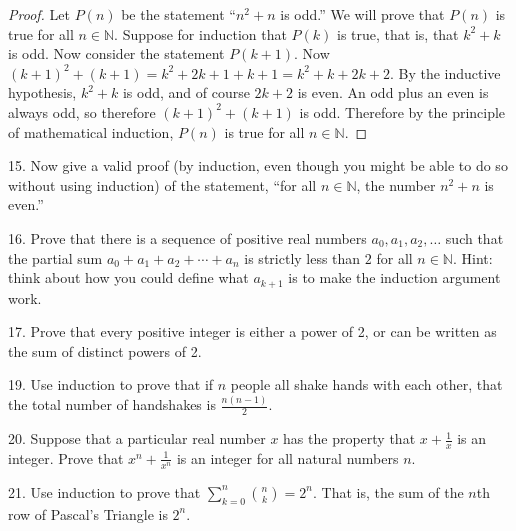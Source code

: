 \documentclass[10pt,]{book}
\theoremstyle{plain}
\theoremstyle{definition}
\numberwithin{equation}{chapter}
\def\d{\displaystyle}
\def\N{\mathbb N}
\begin{document}
\begin{exerciselist}
\begin{proof}
            Let \(P(n)\) be the statement ``\(n^2 + n\) is odd.'' We will prove that \(P(n)\) is true for all \(n \in \N\). Suppose for induction that \(P(k)\) is true, that is, that \(k^2 + k\) is odd. Now consider the statement \(P(k+1)\). Now \((k+1)^2 + (k+1) = k^2 + 2k + 1 + k + 1 = k^2 + k + 2k + 2\). By the inductive hypothesis, \(k^2 + k\) is odd, and of course \(2k + 2\) is even. An odd plus an even is always odd, so therefore \((k+1)^2 + (k+1)\) is odd. Therefore by the principle of mathematical induction, \(P(n)\) is true for all \(n \in \N\).
\end{proof}
\par\smallskip
\item[15.]\hypertarget{exercise-198}{}
          Now give a valid proof (by induction, even though you might be able to do so without using induction) of the statement, ``for all \(n \in \N\), the number \(n^2 + n\) is even.''
\par\smallskip
\item[16.]\hypertarget{exercise-199}{}
          Prove that there is a sequence of positive real numbers \(a_0, a_1, a_2, \ldots\) such that the partial sum \(a_0 + a_1 + a_2 + \cdots + a_n\) is strictly less than \(2\) for all \(n \in \N\). Hint: think about how you could define what \(a_{k+1}\) is to make the induction argument work.
\par\smallskip
\item[17.]\hypertarget{exercise-200}{}
          Prove that every positive integer is either a power of 2, or can be written as the sum of distinct powers of 2.
\par\smallskip
\item[19.]\hypertarget{exercise-202}{}
          Use induction to prove that if \(n\) people all shake hands with each other, that the total number of handshakes is \(\frac{n(n-1)}{2}\).
\par\smallskip
\item[20.]\hypertarget{exercise-203}{}
          Suppose that a particular real number \(x\) has the property that \(x + \frac{1}{x}\) is an integer. Prove that \(x^n + \frac{1}{x^n}\) is an integer for all natural numbers \(n\).
\par\smallskip
\item[21.]\hypertarget{exercise-204}{}
          Use induction to prove that \(\d\sum_{k=0}^n {n \choose k} = 2^n\). That is, the sum of the \(n\)th row of Pascal's Triangle is \(2^n\).
\par\smallskip

\end{exerciselist}
\end{document}
